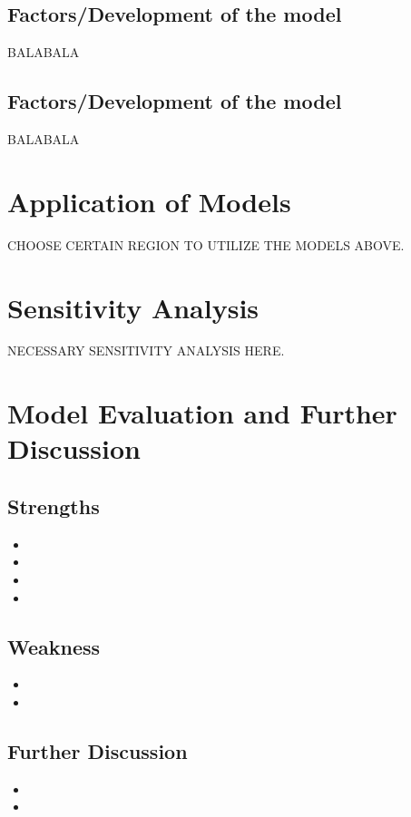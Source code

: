 \documentclass{mcmthesis}
\begin{document}
\subsection{Factors/Development of the model}
BALABALA
\subsection{Factors/Development of the model}
BALABALA

\section{Application of Models}
CHOOSE CERTAIN REGION TO UTILIZE THE MODELS ABOVE.

\section{Sensitivity Analysis}
NECESSARY SENSITIVITY ANALYSIS HERE.

\section{Model Evaluation and Further Discussion}
\subsection{Strengths}
\begin{itemize}
	\item
	\item
	\item
	\item
\end{itemize}
\subsection{Weakness}
\begin{itemize}
	\item
	\item
\end{itemize}
\subsection{Further Discussion}
\begin{itemize}
	\item
	\item
\end{itemize}
\end{document}
